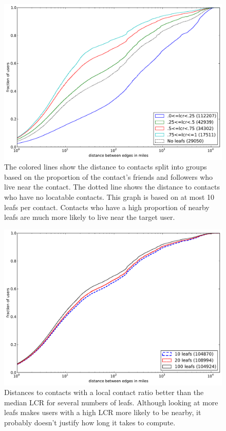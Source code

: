 \begin{figure}[tbh]
\centering
\includegraphics[width=\linewidth]{figures/locals_10.pdf}
\caption{
The colored lines show the distance to contacts split into groups based on the
proportion of the contact's friends and followers who live near the contact.
The dotted line shows the distance to contacts who have no locatable contacts.
This graph is based on at most 10 leafs per contact.
Contacts who have a high proportion of nearby leafs are much more likely to
live near the target user.
}
\label{fig:Local10}
\end{figure}

\begin{figure}[tbh]
\centering
\includegraphics[width=\linewidth]{figures/locals_cmp.pdf}
\caption{
    Distances to contacts with a local contact ratio better than the median LCR
    for several numbers of leafs.
    Although looking at more leafs makes users with a high LCR more likely to
    be nearby, it probably doesn't justify how long it takes to compute.
}
\label{fig:LocalCmp}
\end{figure}

